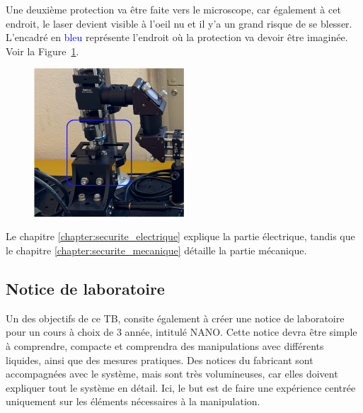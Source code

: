 \begin{minipage}{\textwidth}
    Une deuxième protection va être faite vers le microscope, car également à cet endroit, le laser devient visible à l'oeil nu et il y'a un grand risque de se blesser. L'encadré en \textcolor{blue}{bleu} représente l'endroit où la protection va devoir être imaginée. Voir la Figure~\ref{protection_laser_fin}.
    \vspace{1em}
    \begin{figure}[H]
        \begin{center}
            \includegraphics[width=0.5\textwidth]{assets/figures/Introduction/protection_fin_laser.png}
        \end{center}
        \label{protection_laser_fin}
    \end{figure}
\end{minipage}

\vspace{1em}
Le chapitre \ref{chapter:securite_electrique} explique la partie électrique, tandis que le chapitre \ref{chapter:securite_mecanique} détaille la partie mécanique.

\subsection{Notice de laboratoire}

Un des objectifs de ce TB, consite également à créer une notice de laboratoire pour un cours à choix de 3\ieme{} année, intitulé NANO. Cette notice devra être simple à comprendre, compacte et comprendra des manipulations avec différents liquides, ainsi que des mesures pratiques. Des notices du fabricant sont accompagnées avec le système, mais sont très volumineuses, car elles doivent expliquer tout le système en détail. Ici, le but est de faire une expérience centrée uniquement sur les éléments nécessaires à la manipulation.

